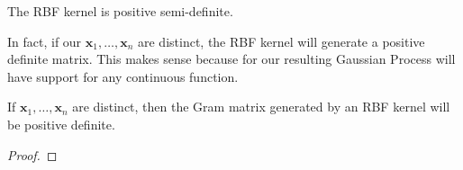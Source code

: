 \begin{corollary}
    The RBF kernel is positive semi-definite.
\end{corollary}

In fact, if our $\mathbf{x}_1, \ldots, \mathbf{x}_n$ are distinct, the RBF kernel will generate a positive definite matrix.
This makes sense because for our resulting Gaussian Process will have support for any continuous function.

\begin{lemma}
    If $\mathbf{x}_1, \ldots, \mathbf{x}_n$ are distinct, then the Gram matrix generated by an RBF kernel will be positive definite.
\end{lemma}
\begin{proof}

\end{proof}
